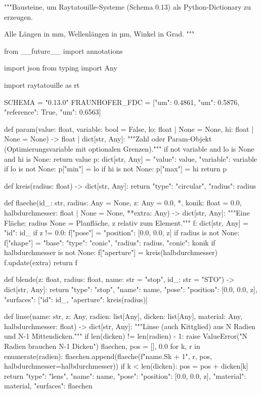 \documentclass[11pt,a4paper,openany]{book}
\DeclareRobustCommand{\code}[1]{\texttt{\directlua{rttcode("\luaescapestring{\detokenize{#1}}")}}}
\begin{document}
\begin{pycode}[title={\code{rtt_bausteine.py}}]
"""Bausteine, um Raytatouille-Systeme (Schema 0.13) als Python-Dictionary zu erzeugen.

Alle Längen in mm, Wellenlängen in µm, Winkel in Grad.
"""

from __future__ import annotations

import json
from typing import Any

import raytatouille as rt

SCHEMA = "0.13.0"
FRAUNHOFER_FDC = [{"um": 0.4861}, {"um": 0.5876, "reference": True}, {"um": 0.6563}]


def param(value: float, variable: bool = False, lo: float | None = None,
          hi: float | None = None) -> float | dict[str, Any]:
    """Zahl oder Param-Objekt (Optimierungsvariable mit optionalen Grenzen)."""
    if not variable and lo is None and hi is None:
        return value
    p: dict[str, Any] = {"value": value, "variable": variable}
    if lo is not None:
        p["min"] = lo
    if hi is not None:
        p["max"] = hi
    return p


def kreis(radius: float) -> dict[str, Any]:
    return {"type": "circular", "radius": radius}


def flaeche(id_: str, radius: Any = None, z: Any = 0.0, *, konik: float = 0.0,
            halbdurchmesser: float | None = None, **extra: Any) -> dict[str, Any]:
    """Eine Fläche; radius None = Planfläche, z relativ zum Element."""
    f: dict[str, Any] = {"id": id_}
    if z != 0.0:
        f["pose"] = {"position": [0.0, 0.0, z]}
    if radius is not None:
        f["shape"] = {"base": {"type": "conic", "radius": radius, "conic": konik}}
    if halbdurchmesser is not None:
        f["aperture"] = kreis(halbdurchmesser)
    f.update(extra)
    return f


def blende(z: float, radius: float, name: str = "stop", id_: str = "STO") -> dict[str, Any]:
    return {"type": "stop", "name": name, "pose": {"position": [0.0, 0.0, z]},
            "surfaces": [{"id": id_, "aperture": kreis(radius)}]}


def linse(name: str, z: Any, radien: list[Any], dicken: list[Any], material: Any,
          halbdurchmesser: float) -> dict[str, Any]:
    """Linse (auch Kittglied) aus N Radien und N-1 Mittendicken."""
    if len(dicken) != len(radien) - 1:
        raise ValueError("N Radien brauchen N-1 Dicken")
    flaechen, pos = [], 0.0
    for k, r in enumerate(radien):
        flaechen.append(flaeche(f"{name}.S{k + 1}", r, pos, halbdurchmesser=halbdurchmesser))
        if k < len(dicken):
            pos = pos + dicken[k]
    return {"type": "lens", "name": name, "pose": {"position": [0.0, 0.0, z]},
            "material": material, "surfaces": flaechen}



\end{pycode}
\end{document}
